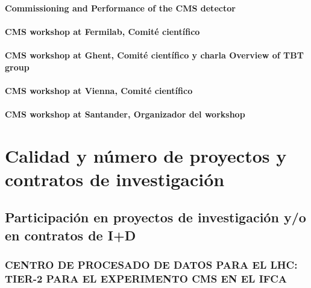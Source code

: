 \documentclass[a4paper, 11pt, twoside, openright]{report}
\begin{document}
\paragraph{Commissioning and Performance of the CMS detector}


\paragraph{CMS workshop at Fermilab, Comité científico}


\paragraph{CMS workshop at Ghent, Comité científico y charla Overview of TBT group}


\paragraph{CMS workshop at Vienna, Comité científico}


\paragraph{CMS workshop at Santander, Organizador del workshop}




\section{Calidad y número de proyectos y contratos de investigación}

\subsection{Participación en proyectos de investigación y/o en contratos de I+D}

\subsubsection{CENTRO DE PROCESADO DE DATOS PARA EL LHC: TIER-2 PARA EL EXPERIMENTO CMS EN EL IFCA}

\end{document}
